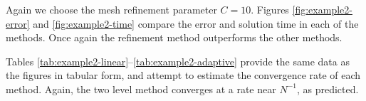 \documentclass[12pt]{article}
\begin{document}
Again we choose the mesh refinement parameter $C=10$.  
Figures \ref{fig:example2-error} and \ref{fig:example2-time} compare
the error and solution time in each of the methods.  Once again the
refinement method outperforms the other methods.  

Tables \ref{tab:example2-linear}--\ref{tab:example2-adaptive} provide
the same data as the figures in tabular form, and attempt to estimate
the convergence rate of each method. Again, the two level method
converges at a rate near $N^{-1}$, as predicted.  



%
\end{document}
